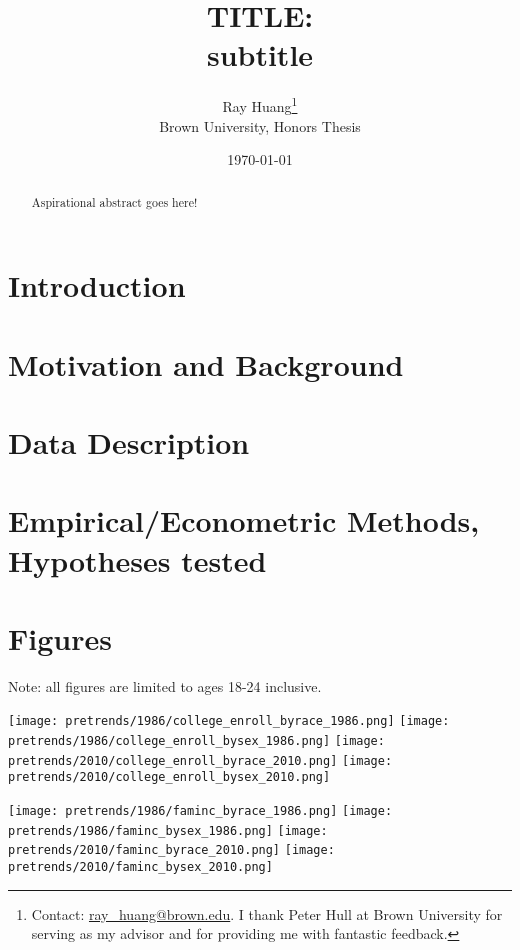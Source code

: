 \documentclass{article}
\title{TITLE:\texorpdfstring{\\}{} subtitle}
\author{Ray Huang\thanks{Contact:
    \href{mailto:ray_huang@brown.edu}{ray\_huang@brown.edu}.
     I thank Peter Hull at Brown University for serving as my advisor and for providing me with fantastic feedback.}
     \\Brown University, Honors Thesis}
\date{\today}
\begin{document}
\maketitle

\begin{abstract}
\noindent Aspirational abstract goes here!
\end{abstract}

\clearpage

\section*{Introduction}

\section*{Motivation and Background}

\section*{Data Description}

\section*{Empirical/Econometric Methods, Hypotheses tested}

\section*{Figures}

Note: all figures are limited to ages 18-24 inclusive.

\begin{center}
\texttt{[image: pretrends/1986/college\_enroll\_byrace\_1986.png]}
\texttt{[image: pretrends/1986/college\_enroll\_bysex\_1986.png]}
\texttt{[image: pretrends/2010/college\_enroll\_byrace\_2010.png]}
\texttt{[image: pretrends/2010/college\_enroll\_bysex\_2010.png]}
\end{center}

\begin{center}
  \texttt{[image: pretrends/1986/faminc\_byrace\_1986.png]}
  \texttt{[image: pretrends/1986/faminc\_bysex\_1986.png]}
  \texttt{[image: pretrends/2010/faminc\_byrace\_2010.png]}
  \texttt{[image: pretrends/2010/faminc\_bysex\_2010.png]}
\end{center}
\end{document}
